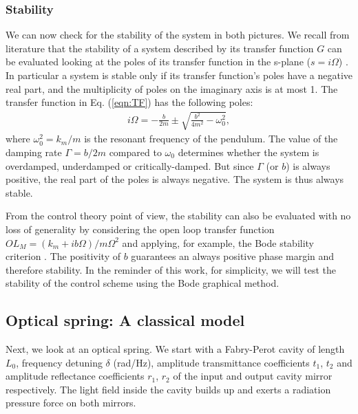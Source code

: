 
\subsubsection{Stability}
We can now check for the stability of the system in both pictures.
We recall from literature that the stability of a system described by its transfer function $G$ can be evaluated looking at the poles 
of its transfer function in the s-plane ($s=i\Omega$) \cite{Greensite70}. In particular a system is stable only if its transfer function's poles have
a negative real part,  and the multiplicity of poles on the imaginary axis is at most 1.
The transfer function in Eq. (\ref{eqn:TF}) has the following poles:
\begin{align}
\label{eqn:poles}
i\Omega=-\frac{b}{2m}\pm\sqrt{\frac{b^2}{4m^2}-\omega_0^2},
\end{align}
where $\omega_0^2=k_m/m$ is the resonant frequency of the pendulum. 
The value of the damping rate $\Gamma=b/2m$ compared to $\omega_0$ determines whether the system is overdamped, underdamped or critically-damped. But since  $\Gamma$ (or $b$) is always positive, 
the real part of the poles is always negative. The system is thus always stable. 

From the control theory point of view, the stability can also be evaluated with no loss of generality by considering the open loop transfer function $OL_M= (k_m+ib\Omega)/m\Omega^2$ and applying, for example, the Bode stability criterion \cite{Franklin94}. The positivity of $b$ guarantees an always positive phase margin and therefore stability.
In the reminder of this work, for simplicity, we will test the stability of the control scheme using the Bode graphical method.


\subsection{Optical spring: A classical model}
\label{sec:classicalModel}
Next, we look at an optical spring.
We start with a Fabry-Perot  cavity of length 
$L_0$, frequency detuning $\delta$ (rad/Hz), amplitude transmittance coefficients $t_1$, $t_2$  and amplitude reflectance coefficients $r_1$, $r_2$ of the input and output cavity mirror respectively. 
The light field inside the cavity builds up and exerts a radiation pressure force on both mirrors.

